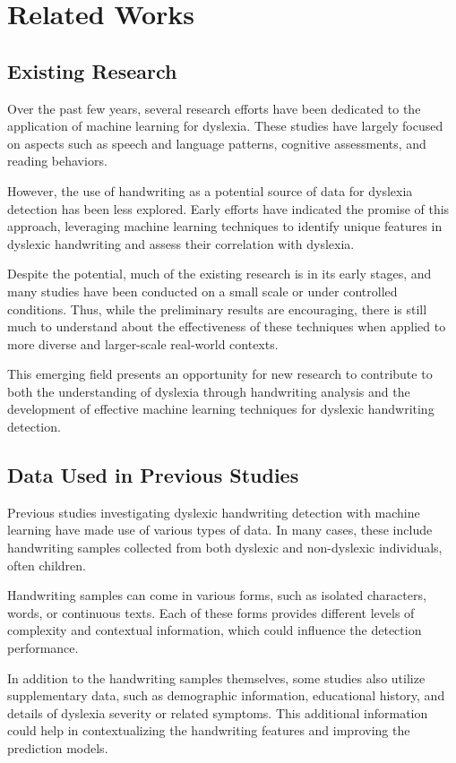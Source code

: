 \section{Related Works}
\subsection{Existing Research}
Over the past few years, several research efforts have been dedicated to the application of machine learning for dyslexia. These studies have largely focused on aspects such as speech and language patterns, cognitive assessments, and reading behaviors.

However, the use of handwriting as a potential source of data for dyslexia detection has been less explored. Early efforts have indicated the promise of this approach, leveraging machine learning techniques to identify unique features in dyslexic handwriting and assess their correlation with dyslexia.

Despite the potential, much of the existing research is in its early stages, and many studies have been conducted on a small scale or under controlled conditions. Thus, while the preliminary results are encouraging, there is still much to understand about the effectiveness of these techniques when applied to more diverse and larger-scale real-world contexts.

This emerging field presents an opportunity for new research to contribute to both the understanding of dyslexia through handwriting analysis and the development of effective machine learning techniques for dyslexic handwriting detection.

\newpage
\subsection{Data Used in Previous Studies}
Previous studies investigating dyslexic handwriting detection with machine learning have made use of various types of data. In many cases, these include handwriting samples collected from both dyslexic and non-dyslexic individuals, often children.

Handwriting samples can come in various forms, such as isolated characters, words, or continuous texts. Each of these forms provides different levels of complexity and contextual information, which could influence the detection performance.

In addition to the handwriting samples themselves, some studies also utilize supplementary data, such as demographic information, educational history, and details of dyslexia severity or related symptoms. This additional information could help in contextualizing the handwriting features and improving the prediction models.


